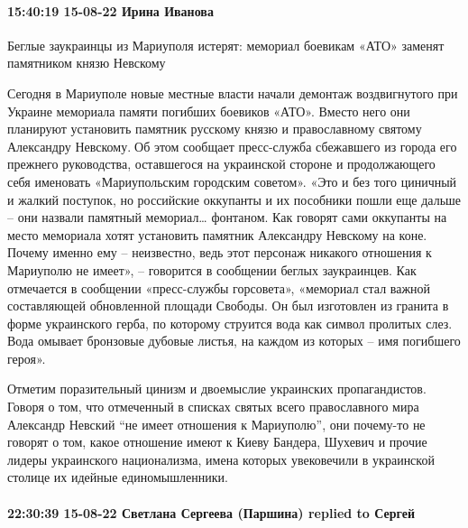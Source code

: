 
 
 
 
 

\paragraph{15:40:19 15-08-22 Ирина Иванова}

Беглые заукраинцы из Мариуполя истерят: мемориал боевикам «АТО» заменят
памятником князю Невскому

Сегодня в Мариуполе новые местные власти начали демонтаж воздвигнутого при
Украине мемориала памяти погибших боевиков «АТО». Вместо него они планируют
установить памятник русскому князю и православному святому Александру
Невскому.Об этом сообщает пресс-служба сбежавшего из города его прежнего
руководства, оставшегося на украинской стороне и продолжающего себя именовать
«Мариупольским городским советом». «Это и без того циничный и жалкий поступок,
но российские оккупанты и их пособники пошли еще дальше – они назвали памятный
мемориал… фонтаном. Как говорят сами оккупанты на место мемориала хотят
установить памятник Александру Невскому на коне. Почему именно ему –
неизвестно, ведь этот персонаж никакого отношения к Мариуполю не имеет», –
говорится в сообщении беглых заукраинцев. Как отмечается в сообщении
«пресс-службы горсовета», «мемориал стал важной составляющей обновленной
площади Свободы. Он был изготовлен из гранита в форме украинского герба, по
которому струится вода как символ пролитых слез. Вода омывает бронзовые дубовые
листья, на каждом из которых – имя погибшего героя». 

Отметим поразительный цинизм и двоемыслие украинских пропагандистов. Говоря о
том, что отмеченный в списках святых всего православного мира Александр Невский
“не имеет отношения к Мариуполю”, они почему-то не говорят о том, какое
отношение имеют к Киеву Бандера, Шухевич и прочие лидеры украинского
национализма, имена которых увековечили в украинской столице их идейные
единомышленники. 

\paragraph{22:30:39 15-08-22 Светлана Сергеева (Паршина) replied to Сергей}


